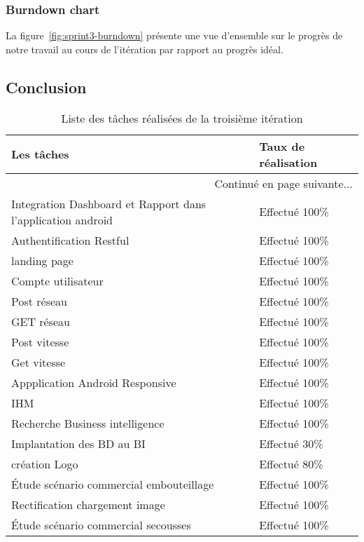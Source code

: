\subsubsection{Burndown chart}
La figure~\ref{fig:sprint3-burndown} présente une vue d'ensemble sur le progrès
de notre travail au cours de l'itération par rapport au progrès idéal.

\subsection{Conclusion}

\begin{center}
    \begin{longtable}{| l | l |}
        \caption{Liste des tâches réalisées de la troisième itération}
        \label{tab:sprint3-estimation} \\

        \hline
        \textbf{Les tâches} & \textbf{Taux de réalisation} \\ \hline
        \endhead

        \hline \multicolumn{2}{|r|}{{Continué en page suivante$\dotsc$}} \\ \hline
        \endfoot

        \hline \hline
        \endlastfoot

        \hline
Integration Dashboard et Rapport dans l'application android & Effectué 100\% \\ \hline
Authentification Restful&  Effectué 100\% \\ \hline
landing page& Effectué 100\% \\ \hline
Compte utilisateur& Effectué 100\% \\ \hline
Post réseau& Effectué 100\% \\ \hline
GET réseau&  Effectué 100\% \\ \hline
Post vitesse&  Effectué 100\% \\ \hline
Get vitesse& Effectué 100\% \\ \hline
Appplication Android Responsive & Effectué 100\% \\ \hline
IHM & Effectué 100\% \\ \hline
Recherche Business intelligence& Effectué 100\% \\ \hline
Implantation des BD au BI & Effectué 30\% \\ \hline
création Logo&  Effectué 80\% \\ \hline
Étude scénario commercial embouteillage& Effectué 100\% \\ \hline
Rectification chargement image & Effectué 100\% \\ \hline
Étude scénario commercial secousses &  Effectué 100\% \\ \hline
\end{longtable}
\end{center}
